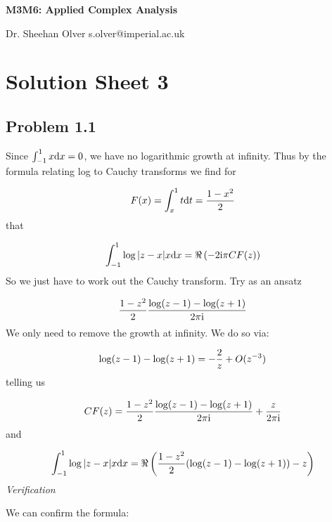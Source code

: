 \documentclass[12pt,a4paper]{article}
\def\D{ {\rm d} }
\def\I{ {\rm i} }
\def\dx{\D x}
\def\dt{\D t}
\def\pr(#1){\left({#1}\right)}
\begin{document}
\textbf{M3M6: Applied Complex Analysis}

Dr. Sheehan Olver s.olver@imperial.ac.uk

\section{Solution Sheet 3}
\subsection{Problem 1.1}
Since $\int_{-1}^1 x \dx = 0$, we have no logarithmic growth at infinity.  Thus by the formula relating log to Cauchy transforms we find for

\[
F(x) = \int_x^1 t \dt = {1 - x^2 \over 2}
\]
that

\[
\int_{-1}^1 \log|z-x| x \dx = \Re\pr({-2 \I \pi C F(z)})
\]
So we just have to work out the Cauchy transform. Try as an ansatz

\[
{1 - z^2 \over 2} {\log(z-1) - \log(z+1) \over 2 \pi \I}
\]
We only need to remove the growth at infinity. We do so via:

\[
\log(z-1) - \log(z+1)  = -{2 \over z} + O(z^{-3})
\]
telling us

\[
C F(z) = {1 - z^2 \over 2} {\log(z-1) - \log(z+1)  \over 2 \pi \I} + {z \over 2 \pi \I}
\]
and

\[
\int_{-1}^1 \log|z-x| x \dx = \Re \left({1 - z^2 \over 2} (\log(z-1) - \log(z+1)) - z \right)
\]
\emph{Verification}

We can confirm the formula:
\end{document}
